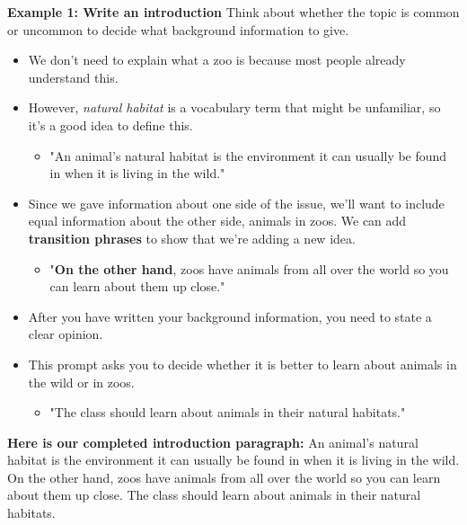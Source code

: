 \documentclass[12pt]{article}
\begin{document}
\begin{tcolorbox}[colframe=black!60, colback=white, 
coltitle=black, colbacktitle=black!15, fonttitle=\bfseries\Large, 
title=Examples, halign title=center, left=10pt, right=10pt, top=10pt, bottom=15pt]

\textbf{Example 1: Write an introduction}
Think about whether the topic is common or uncommon to decide what background information to give.
    \begin{itemize}
        \item We don't need to explain what a zoo is because most people already understand this.
        \item However, \textit{natural habitat} is a vocabulary term that might be unfamiliar, so it's a good idea to define this.
        \begin{itemize}
            \item "An animal's natural habitat is the environment it can usually be found in when it is living in the wild."
        \end{itemize}
        \item Since we gave information about one side of the issue, we'll want to include equal information about the other side, animals in zoos. We can add \textbf{transition phrases} to show that we're adding a new idea.
        \begin{itemize}
            \item "\textbf{On the other hand}, zoos have animals from all over the world so you can learn about them up close."
        \end{itemize}
    \end{itemize}
\begin{itemize}
    \item After you have written your background information, you need to state a clear opinion.
\end{itemize}
\begin{itemize}
    \item This prompt asks you to decide whether it is better to learn about animals in the wild or in zoos.
    \begin{itemize}
        \item "The class should learn about animals in their natural habitats."
    \end{itemize}
\end{itemize}


\textbf{Here is  our completed introduction paragraph:} An animal's natural habitat is the environment it can usually be found in when it is living in the wild. On the other hand, zoos have animals from all over the world so you can learn about them up close. The class should learn about animals in their natural habitats.







     \end{tcolorbox}
\end{document}
